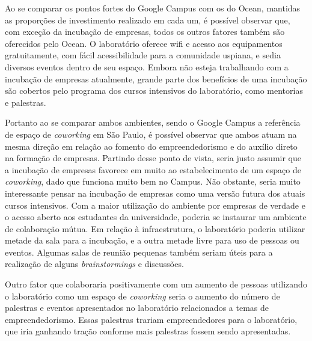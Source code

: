 Ao se comparar os pontos fortes do Google Campus com os do Ocean, mantidas as proporções de investimento realizado em cada um, é possível observar que, com exceção da incubação de empresas, todos os outros fatores também são oferecidos pelo Ocean. O laboratório oferece wifi e acesso aos equipamentos gratuitamente, com fácil acessibilidade para a comunidade uspiana, e sedia diversos eventos dentro de seu espaço. Embora não esteja trabalhando com a incubação de empresas atualmente, grande parte dos benefícios de uma incubação são cobertos pelo programa dos cursos intensivos do laboratório, como mentorias e palestras.

Portanto ao se comparar ambos ambientes, sendo o Google Campus a referência de espaço de \textit{coworking} em São Paulo, é possível observar que ambos atuam na mesma direção em relação ao fomento do empreendedorismo e do auxílio direto na formação de empresas. Partindo desse ponto de vista, seria justo assumir que a incubação de empresas favorece em muito ao estabelecimento de um espaço de \textit{coworking}, dado que funciona muito bem no Campus. Não obstante, seria muito interessante pensar na incubação de empresas como uma versão futura dos atuais cursos intensivos. Com a maior utilização do ambiente por empresas de verdade e o acesso aberto aos estudantes da universidade, poderia se instaurar um ambiente de colaboração mútua. Em relação à infraestrutura, o laboratório poderia utilizar metade da sala para a incubação, e a outra metade livre para uso de pessoas ou eventos. Algumas salas de reunião pequenas também seriam úteis para a realização de alguns \textit{brainstormings} e discussões.

Outro fator que colaboraria positivamente com um aumento de pessoas utilizando o laboratório como um espaço de \textit{coworking} seria o aumento do número de palestras e eventos apresentados no laboratório relacionados a temas de empreendedorismo. Essas palestras trariam empreendedores para o laboratório, que iria ganhando tração conforme mais palestras fossem sendo apresentadas.
